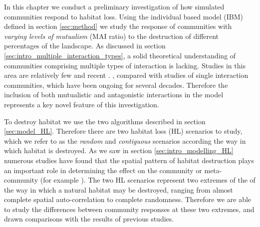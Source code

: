 In this chapter we conduct a preliminary investigation of how simulated communities respond to habitat loss. Using the individual based model (IBM) defined in section \ref{sec:method} we study the response of communities with \emph{varying levels of mutualism} (MAI ratio) to the destruction of different percentages of the landscape. As discussed in section \ref{sec:intro_multiple_interaction_types}, a solid theoretical understanding of communities comprising multiple types of interaction is lacking. Studies in this area are relatively few and recent \cite{sauve2014structure,fontaine2011ecological,kefi2012more,pocock2012robustness,mougi2012diversity,evans2013robustness}. , compared with studies of single interaction communities, which have been ongoing for several decades. Therefore the inclusion of both mutualistic and antagonistic interactions in the model represents a key novel feature of this investigation.  

To destroy habitat we use the two algorithms described in section \ref{sec:model_HL}. Therefore there are two habitat loss (HL) scenarios to study, which we refer to as the \emph{random} and \emph{contiguous} scenarios according the way in which habitat is destroyed. As we saw in section \ref{sec:intro_modelling_HL} numerous studies have found that the spatial pattern of habitat destruction plays an important role in determining the effect on the community or meta-community (for example \cite{ovaskainen2002metapopulation,jager2006simulated,sole2006ecological}). The two HL scenarios represent two extremes of the of the way in which a natural habitat may be destroyed, ranging from almost complete spatial auto-correlation to complete randomness. Therefore we are able to study the differences between community responses at these two extremes, and drawn comparisons with the results of previous studies.

